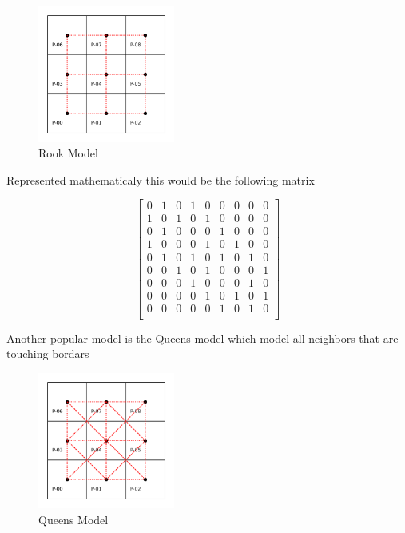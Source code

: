 \documentclass{article}
\begin{document}
\begin{figure}[H]
	\centering
	\includegraphics[width=0.4\textwidth]{assets/rook.png}
	\caption{Rook Model}
\end{figure}


Represented mathematicaly this would be the following matrix

\[
	\begin{bmatrix}
		0 & 1 & 0 & 1 & 0 & 0 & 0 & 0 & 0 \\
		1 & 0 & 1 & 0 & 1 & 0 & 0 & 0 & 0 \\
		0 & 1 & 0 & 0 & 0 & 1 & 0 & 0 & 0 \\
		1 & 0 & 0 & 0 & 1 & 0 & 1 & 0 & 0 \\
		0 & 1 & 0 & 1 & 0 & 1 & 0 & 1 & 0 \\
		0 & 0 & 1 & 0 & 1 & 0 & 0 & 0 & 1 \\
		0 & 0 & 0 & 1 & 0 & 0 & 0 & 1 & 0 \\
		0 & 0 & 0 & 0 & 1 & 0 & 1 & 0 & 1 \\
		0 & 0 & 0 & 0 & 0 & 1 & 0 & 1 & 0 \\
	\end{bmatrix}
\]

Another popular model is the Queens model which model all neighbors that are touching bordars

\begin{figure}[H]
	\centering
	\includegraphics[width=0.4\textwidth]{assets/queens.png}
	\caption{Queens Model}
\end{figure}
\end{document}
